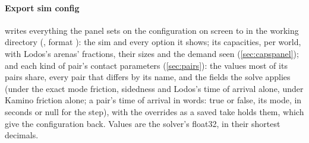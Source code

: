 \paragraph{Export sim config} writes everything the panel sets on the configuration on screen to  in the working directory (, format ): the sim and every option it shows; its capacities, per world, with Lodos's arenas' fractions, their sizes and the demand seen (\cref{sec:capspanel}); and each kind of pair's contact parameters (\cref{sec:pairs}): the values most of its pairs share, every pair that differs by its name, and the fields the solve applies (under the exact mode friction, sidedness and Lodos's time of arrival alone, under Kamino friction alone; a pair's time of arrival in words:  true or false,  its mode,  in seconds or null for the step), with the overrides as a saved take holds them, which give the configuration back. Values are the solver's float32, in their shortest decimals.

